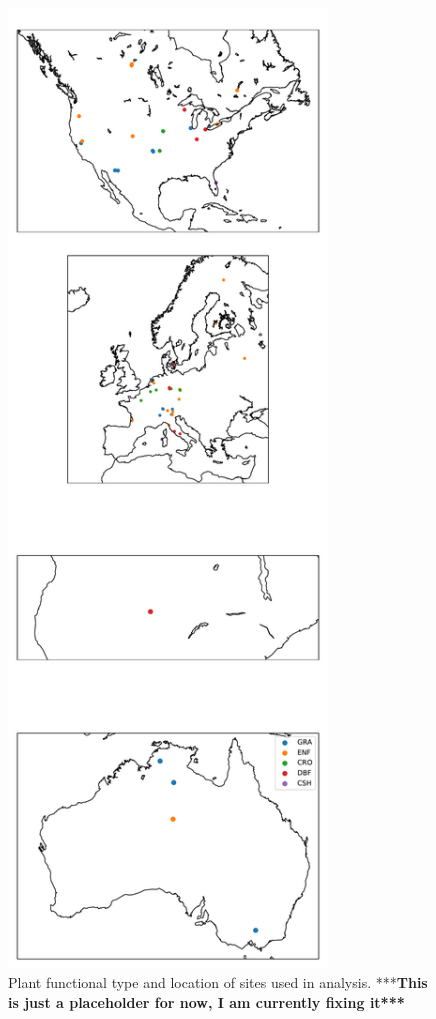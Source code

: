 \documentclass[draft,linenumbers]{agujournal}
\begin{document}
\begin{figure}[h]
\centering
\includegraphics[width=20pc]{./fig01.pdf}
\caption{Plant functional type and location of sites used in analysis. ***\textbf{This is just  a placeholder for now, I am currently fixing it***}}
\label{map_fig}
 \end{figure}
\end{document}
